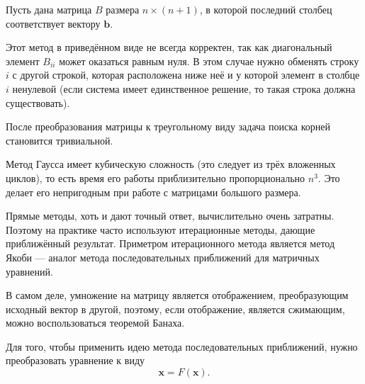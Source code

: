 Пусть дана матрица $B$ размера $n\times(n+1)$, в которой последний
столбец соответствует вектору $\mathbf{b}$.


Этот метод в приведённом виде не всегда корректен, так как диагональный
элемент $B_{ii}$ может оказаться равным нуля. В этом случае нужно
обменять строку $i$ с другой строкой, которая расположена ниже неё
и у которой элемент в столбце $i$ ненулевой (если система имеет единственное
решение, то такая строка должна существовать).

После преобразования матрицы к треугольному виду задача поиска корней
становится тривиальной.

Метод Гаусса имеет кубическую сложность (это следует из трёх вложенных
циклов), то есть время его работы приблизительно пропорционально $n^{3}$.
Это делает его непригодным при работе с матрицами большого размера.



Прямые методы, хоть и дают точный ответ, вычислительно очень затратны.
Поэтому на практике часто используют итерационные методы, дающие приближённый
результат. Приметром итерационного метода является метод Якоби — аналог
метода последовательных приближений для матричных уравнений.

В самом деле, умножение на матрицу является отображением, преобразующим
исходный вектор в другой, поэтому, если отображение, является сжимающим,
можно воспользоваться теоремой Банаха.

Для того, чтобы применить идею метода последовательных приближений,
нужно преобразовать уравнение к виду
\[
\mathbf{x}=F(\mathbf{x}).
\]


